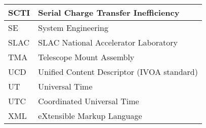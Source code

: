 \begin{longtable}{p{}p{}}
SCTI & Serial Charge Transfer Inefficiency \\\hline
SE & System Engineering \\\hline
SLAC & SLAC National Accelerator Laboratory \\\hline
TMA & Telescope Mount Assembly \\\hline
UCD & Unified Content Descriptor (IVOA standard) \\\hline
UT & Universal Time \\\hline
UTC & Coordinated Universal Time \\\hline
XML & eXtensible Markup Language \\\hline
\end{longtable}
